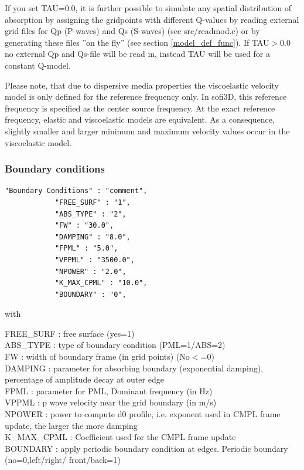 \documentclass[11pt,onecolumn,oneside]{article}
\begin{document}
If you set TAU=0.0, it is further possible to simulate any spatial distribution of absorption by assigning the gridpoints with different Q-values by reading external grid files for Qp (P-waves) and Qs (S-waves) (see src/readmod.c) or by generating these files ''on the fly'' (see section \ref{model_def_func}). If TAU$>$0.0 no external Qp and Qs-file will be read in, instead TAU will be used for a constant Q-model.

Please note, that due to dispersive media properties the viscoelastic velocity model is only defined for the reference frequency only. In sofi3D, this reference frequency is specified as the center source frequency. At the exact reference frequency, elastic and viscoelastic models are equivalent. As a consequence, slightly smaller and larger minimum and maximum velocity values occur in the viscoelastic model.


\subsubsection{Boundary conditions}
\label{abs}

\begin{verbatim}
"Boundary Conditions" : "comment",
			"FREE_SURF" : "1", 
			"ABS_TYPE" : "2",
			"FW" : "30.0",
			"DAMPING" : "8.0",
			"FPML" : "5.0",
			"VPPML" : "3500.0",
			"NPOWER" : "2.0",
			"K_MAX_CPML" : "10.0",
			"BOUNDARY" : "0",
\end{verbatim}

with

FREE\_SURF : free surface (yes=1)\\
ABS\_TYPE : type of boundary condition (PML=1/ABS=2)\\
FW : width of boundary frame (in grid points) (No$<$=0)\\
DAMPING : parameter for absorbing boundary (exponential damping), percentage of amplitude decay at outer edge\\
FPML : parameter for PML, Dominant frequency (in Hz)\\
VPPML : p wave velocity near the grid boundary (in m/s)\\
NPOWER :  power to compute d0 profile, i.e. exponent used in CMPL frame update, the larger the more damping \\
K\_MAX\_CPML :  Coefficient used for the CMPL frame update \\
BOUNDARY : apply periodic boundary condition at edges. Periodic boundary (no=0,left/right/ front/back=1) \\
\end{document}
